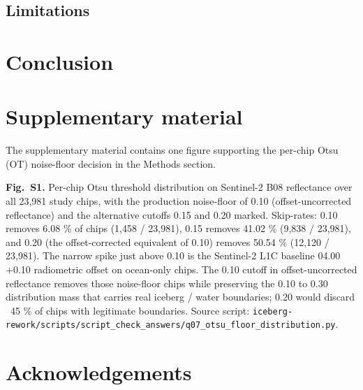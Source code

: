 \documentclass[review,jog]{igs}
\begin{document}
\subsection{Limitations}


\section{Conclusion}


\section{Supplementary material}

The supplementary material contains one figure supporting the per-chip Otsu (OT) noise-floor decision in the Methods section.

\textbf{Fig.~S1.} Per-chip Otsu threshold distribution on Sentinel-2 B08 reflectance over all 23,981 study chips, with the production noise-floor of 0.10 (offset-uncorrected reflectance) and the alternative cutoffs 0.15 and 0.20 marked. Skip-rates: 0.10 removes 6.08 \% of chips (1,458 / 23,981), 0.15 removes 41.02 \% (9,838 / 23,981), and 0.20 (the offset-corrected equivalent of 0.10) removes 50.54 \% (12,120 / 23,981). The narrow spike just above 0.10 is the Sentinel-2 L1C baseline 04.00 +0.10 radiometric offset on ocean-only chips. The 0.10 cutoff in offset-uncorrected reflectance removes those noise-floor chips while preserving the 0.10 to 0.30 distribution mass that carries real iceberg / water boundaries; 0.20 would discard ~45 \% of chips with legitimate boundaries. Source script: \texttt{iceberg-rework/scripts/script\_check\_answers/q07\_otsu\_floor\_distribution.py}.


\section{Acknowledgements}




\end{document}
